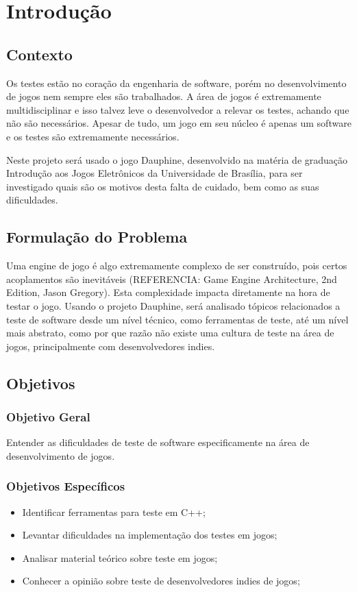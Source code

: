 \chapter[Introdução]{Introdução}

\section{Contexto}

Os testes estão no coração da engenharia de software, porém no desenvolvimento de jogos nem sempre eles são trabalhados. A área de jogos é extremamente multidisciplinar e isso talvez leve o desenvolvedor a relevar os testes, achando que não são necessários. Apesar de tudo, um jogo em seu núcleo é apenas um software e os testes são extremamente necessários.

Neste projeto será usado o jogo Dauphine, desenvolvido na matéria de graduação Introdução aos Jogos Eletrônicos da Universidade de Brasília, para ser investigado quais são os motivos desta falta de cuidado, bem como as suas dificuldades.

\section{Formulação do Problema}

Uma engine de jogo é algo extremamente complexo de ser construído, pois certos acoplamentos são inevitáveis (REFERENCIA: Game Engine Architecture, 2nd Edition, Jason Gregory). Esta complexidade impacta diretamente na hora de testar o jogo. Usando o projeto Dauphine, será analisado tópicos relacionados a teste de software desde um nível técnico, como ferramentas de teste, até um nível mais abstrato, como por que razão não existe uma cultura de teste na área de jogos, principalmente com desenvolvedores indies.

\section{Objetivos}

\subsection{Objetivo Geral}
Entender as dificuldades de teste de software especificamente na área de desenvolvimento de jogos.

\subsection{Objetivos Específicos}
\begin{itemize}
\item Identificar ferramentas para teste em C++;
\item Levantar dificuldades na implementação dos testes em jogos;
\item Analisar material teórico sobre teste em jogos;
\item Conhecer a opinião sobre teste de desenvolvedores indies de jogos;
\end{itemize}

